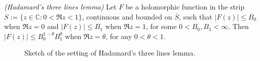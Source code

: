 \begin{mdframed}
	\begin{lemma}\emph{(Hadamard's three lines lemma)}
		Let $F$ be a holomorphic function in the strip $S := \{z \in \mathbb{C}: 0 < \Re z < 1\}$, continuous and bounded on $\overline{S}$, such that $\left| F(z)\right| \leq B_0$ when $\Re z = 0$ and $\left| F(z) \right| \leq B_1$ when $\Re z = 1$, for some $0 < B_0,B_1 < \infty$. Then $\left| F(z) \right| \leq B_0^{1 - \theta}B_1^\theta$ when $\Re z = \theta$, for any $0 < \theta < 1$.
	\end{lemma}
\end{mdframed}

\begin{figure}[h!tb]
	\centering
	\caption{Sketch of the setting of Hadamard's three lines lemma.}
	\label{fig:Hadamards_three_lines_lemma}
\end{figure}


